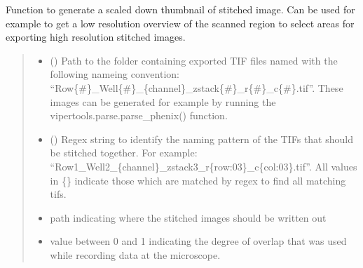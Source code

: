 \documentclass[a4paper,10pt,english,openany,oneside]{sphinxmanual}
\begin{document}
\begin{fulllineitems}
\label{\detokenize{pages/modules:vipertools.stitch.generate_thumbnail}}
\pysigstartsignatures
{}
\pysigstopsignatures
\sphinxAtStartPar
Function to generate a scaled down thumbnail of stitched image. Can be used for example to
get a low resolution overview of the scanned region to select areas for exporting high resolution
stitched images.
\begin{quote}\begin{description}
\begin{itemize}
\item {} 
\sphinxAtStartPar
{} () \textendash{} Path to the folder containing exported TIF files named with the following nameing convention: “Row\{\#\}\_Well\{\#\}\_\{channel\}\_zstack\{\#\}\_r\{\#\}\_c\{\#\}.tif”.
These images can be generated for example by running the vipertools.parse.parse\_phenix() function.

\item {} 
\sphinxAtStartPar
{} () \textendash{} Regex string to identify the naming pattern of the TIFs that should be stitched together.
For example: “Row1\_Well2\_\{channel\}\_zstack3\_r\{row:03\}\_c\{col:03\}.tif”.
All values in \{\} indicate those which are matched by regex to find all matching tifs.

\item {} 
\sphinxAtStartPar
{} \textendash{} path indicating where the stitched images should be written out

\item {} 
\sphinxAtStartPar
{} \textendash{} value between 0 and 1 indicating the degree of overlap that was used while recording data at the microscope.


\end{itemize}
\end{description}
\end{quote}
\end{fulllineitems}
\end{document}
